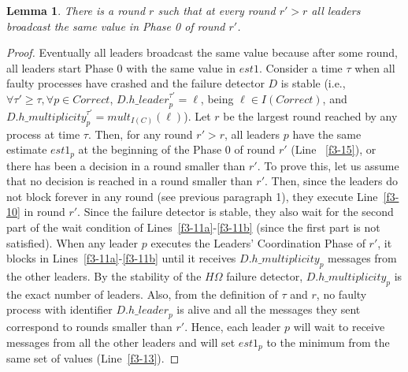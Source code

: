 \documentclass[10pt, conference, compsocconf]{IEEEtran}
\newtheorem{lemma}{Lemma}
\newcommand{\HO}{{H\Omega}}
\newcommand{\C}{{\mathit{Correct}}}
\newcommand{\leader}{{\mathit{h\_leader}}}
\newcommand{\multiplicity}{{\mathit{h\_multiplicity}}}
\begin{document}
\begin{lemma} 
\label{same-value}
There  is a  round  $r$ such  that  at every  round $r'  >  r$ all  leaders
broadcast the same value in Phase 0 of round $r'$. 
\end{lemma} 
\begin{proof}
Eventually all leaders  broadcast the same value because  after some round,
all leaders start Phase 0 with the same value in $est1$. 
Consider  a time  $\tau$ when  all faulty  processes have  crashed  and the
failure detector $D$ is stable (i.e.,  
$\forall \tau' \ge \tau, \forall p \in \C$, $D.\leader_p^{\tau'}=\ell$,
 being $\ell \in I(\C)$, and $D.\multiplicity_p^{\tau'}=mult_{I(C)}(\ell)$). 
Let $r$ be  the largest round reached by any process  at time $\tau$. Then,
for any round $r'>r$, all 
leaders $p$ have the same estimate $est1_p$ at the beginning of the Phase 0
of round $r'$ (Line ~\ref{f3-15}), or  there has been a decision in a round
smaller than $r'$. To prove this, let us assume that no decision is reached
in a round smaller than $r'$. 
Then, since  the leaders do  not block forever  in any round  (see previous
paragraph  1),  they execute  Line~\ref{f3-10}  in  round  $r'$. Since  the
failure detector is stable, they also  wait for the second part of the wait
condition of  Lines~\ref{f3-11a}-\ref{f3-11b} (since the first  part is not
satisfied). 
When any  leader $p$ executes the  Leaders' Coordination Phase  of $r'$, it
blocks    in     Lines~\ref{f3-11a}-\ref{f3-11b}    until    it    receives
$D.\multiplicity_p$ messages  from the other  leaders. By the  stability of
the  $\HO$ failure  detector, $D.\multiplicity_p$  is the  exact  number of
leaders. Also,  from the  definition of $\tau$  and $r$, no  faulty process
with  identifier $D.\leader_p$  is alive  and  all the  messages they  sent
correspond to rounds smaller than $r'$. 
Hence, each  leader $p$ will  wait to receive  messages from all  the other
leaders and  will set $est1_p$ to the  minimum from the same  set of values
(Line~\ref{f3-13}). 
\end{proof}
\end{document}
